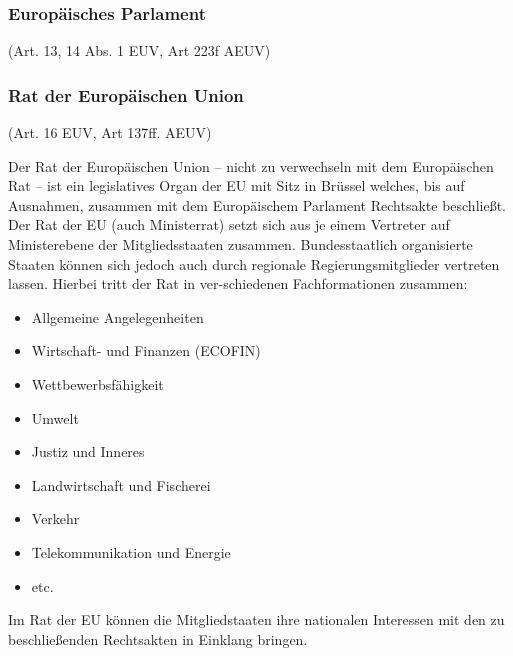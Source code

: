 

\subsubsection{Europäisches Parlament}

\begin{center}
    {\footnotesize(Art. 13, 14 Abs. 1 EUV, Art 223f AEUV)}
\end{center}

\noindent


\subsubsection{Rat der Europäischen Union}

\begin{center}
    {\footnotesize(Art. 16 EUV, Art 137ff. AEUV)}
\end{center}

\noindent
Der Rat der Europäischen Union – nicht zu verwechseln mit dem Europäischen Rat – ist ein legislatives Organ der EU mit Sitz in Brüssel welches, bis auf Ausnahmen, zusammen mit dem Europäischem Parlament Rechtsakte beschließt.
Der Rat der EU (auch Ministerrat) setzt sich aus je einem Vertreter auf Ministerebene der Mitgliedsstaaten zusammen. Bundesstaatlich organisierte Staaten können sich jedoch auch durch regionale Regierungsmitglieder vertreten lassen. Hierbei tritt der Rat in ver-schiedenen Fachformationen zusammen:

\begin{itemize}
    \item Allgemeine Angelegenheiten
    \item Wirtschaft- und Finanzen (ECOFIN)
    \item Wettbewerbsfähigkeit
    \item Umwelt
    \item Justiz und Inneres
    \item Landwirtschaft und Fischerei
    \item Verkehr
    \item Telekommunikation und Energie
    \item etc.
\end{itemize}

Im Rat der EU können die Mitgliedstaaten ihre nationalen Interessen mit den zu beschließenden Rechtsakten in Einklang bringen.

